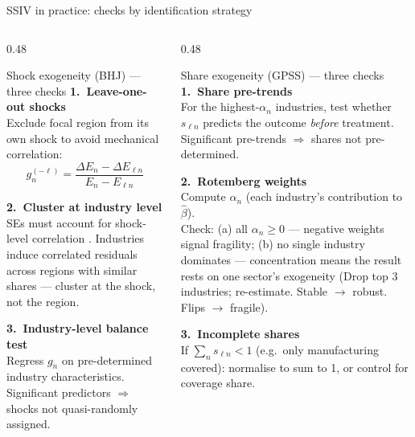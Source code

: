 \documentclass[aspectratio=169, 10pt]{beamer}
\begin{document}
\begin{frame}[shrink=8]{SSIV in practice: checks by identification strategy}

  \begin{columns}[T]
    \begin{column}{0.48\textwidth}
      \begin{block}{Shock exogeneity (BHJ) — three checks}\small
        \textbf{1.\ Leave-one-out shocks}\\
        Exclude focal region from its own shock to avoid mechanical
        correlation:
        \[
          g_n^{(-\ell)} = \frac{\Delta E_n - \Delta E_{\ell n}}{E_n - E_{\ell n}}
        \]

        \textbf{2.\ Cluster at industry level}\\
        SEs must account for shock-level correlation \citep{adao2019}.
        Industries induce correlated residuals across regions with
        similar shares — cluster at the shock, not the region.

        \smallskip
        \textbf{3.\ Industry-level balance test}\\
        Regress $g_n$ on pre-determined industry characteristics.
        Significant predictors $\Rightarrow$ shocks not quasi-randomly
        assigned.
      \end{block}
    \end{column}
    \begin{column}{0.48\textwidth}
      \begin{block}{Share exogeneity (GPSS) — three checks}\small
        \textbf{1.\ Share pre-trends}\\
        For the highest-$\alpha_n$ industries, test whether $s_{\ell n}$
        predicts the outcome \emph{before} treatment.
        Significant pre-trends $\Rightarrow$ shares not pre-determined.

        \smallskip
        \textbf{2.\ Rotemberg weights}\\
        Compute $\alpha_n$ (each industry's contribution to $\hat\beta$).\\
        Check: (a) all $\alpha_n \geq 0$ — negative weights signal
        fragility; (b) no single industry dominates — concentration
        means the result rests on one sector's exogeneity (Drop top 3 industries; re-estimate. Stable $\rightarrow$ robust. Flips $\rightarrow$ fragile).

        \smallskip
        \textbf{3.\ Incomplete shares}\\
        If $\sum_n s_{\ell n} < 1$ (e.g.\ only manufacturing covered):
        normalise to sum to 1, or control for coverage share.
      \end{block}
    \end{column}
  \end{columns}

\end{frame}
\end{document}

